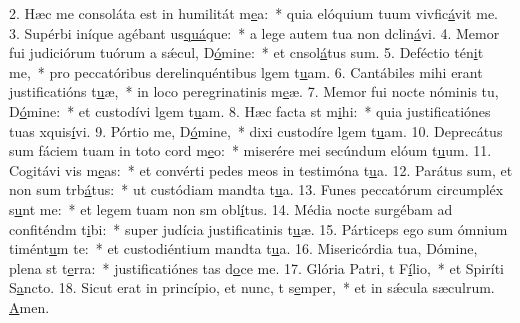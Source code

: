 2. Hæc me consoláta est in humilitát m\uline{e}a:~* quia elóquium tuum vivfic\uline{á}vit me.
3. Supérbi iníque agébant us\uline{quá}que:~* a lege autem tua non dclin\uline{á}vi.
4. Memor fui judiciórum tuórum a sǽcul, D\uline{ó}mine:~* et cnsol\uline{á}tus sum.
5. Deféctio tén\uline{i}t me,~* pro peccatóribus derelinquéntibus lgem t\uline{u}am.
6. Cantábiles mihi erant justificatións t\uline{u}æ,~* in loco peregrinatinis m\uline{e}æ.
7. Memor fui nocte nóminis tu, D\uline{ó}mine:~* et custodívi lgem t\uline{u}am.
8. Hæc facta st m\uline{i}hi:~* quia justificatiónes tuas xquis\uline{í}vi.
9. Pórtio me, D\uline{ó}mine,~* dixi custodíre lgem t\uline{u}am.
10. Deprecátus sum fáciem tuam in toto cord m\uline{e}o:~* miserére mei secúndum elóum t\uline{u}um.
11. Cogitávi vis m\uline{e}as:~* et convérti pedes meos in testimóna t\uline{u}a.
12. Parátus sum, et non sum trb\uline{á}tus:~* ut custódiam mandta t\uline{u}a.
13. Funes peccatórum circumpléx s\uline{u}nt me:~* et legem tuam non sm obl\uline{í}tus.
14. Média nocte surgébam ad confiténdm t\uline{i}bi:~* super judícia justificatinis t\uline{u}æ.
15. Párticeps ego sum ómnium timént\uline{u}m te:~* et custodiéntium mandta t\uline{u}a.
16. Misericórdia tua, Dómine, plena st t\uline{e}rra:~* justificatiónes tas d\uline{o}ce me.
17. Glória Patri, t F\uline{í}lio,~* et Spiríti S\uline{a}ncto.
18. Sicut erat in princípio, et nunc, t s\uline{e}mper,~* et in sǽcula sæculrum. \uline{A}men.
